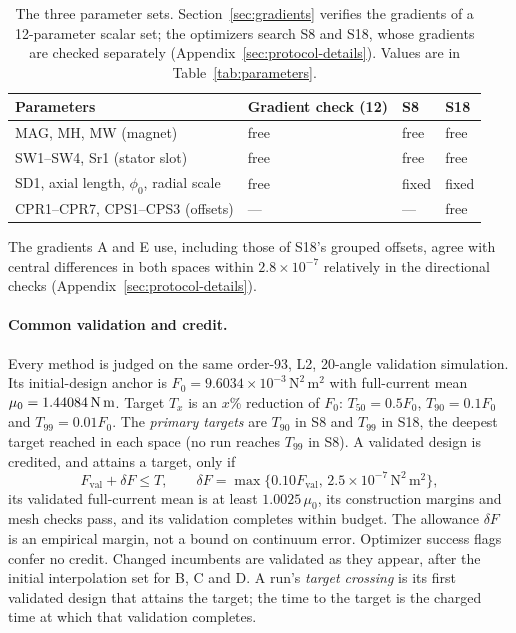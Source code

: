 \begin{table}[H]\centering\small
\caption{The three parameter sets. Section~\ref{sec:gradients} verifies
the gradients of a 12-parameter scalar set; the optimizers search S8 and
S18, whose gradients are checked separately
(Appendix~\ref{sec:protocol-details}). Values are in
Table~\ref{tab:parameters}.}
\label{tab:paramsets}
\begin{tabular}{llll}\toprule
Parameters & Gradient check (12) & S8 & S18\\\midrule
MAG, MH, MW (magnet) & free & free & free\\
SW1--SW4, Sr1 (stator slot) & free & free & free\\
SD1, axial length, $\phi_0$, radial scale & free & fixed & fixed\\
CPR1--CPR7, CPS1--CPS3 (offsets) & --- & --- & free\\\bottomrule
\end{tabular}
\end{table}

The gradients A and E use, including those of S18's grouped offsets,
agree with central differences in both spaces within $2.8\times10^{-7}$
relatively in the directional checks (Appendix~\ref{sec:protocol-details}).

\paragraph{Common validation and credit.}
Every method is judged on the same order-93, L2, 20-angle validation simulation.
Its initial-design anchor is $F_0=9.6034\times10^{-3}\,\mathrm{N^2\,m^2}$ with
full-current mean $\mu_0=1.44084\,\mathrm{N\,m}$. Target $T_x$ is an $x$\% reduction
of $F_0$: $T_{50}=0.5F_0$, $T_{90}=0.1F_0$ and $T_{99}=0.01F_0$. The
\emph{primary targets} are $T_{90}$ in S8 and $T_{99}$ in S18, the deepest
target reached in each space (no run reaches $T_{99}$ in S8). A validated
design is credited, and attains a target, only if
\begin{equation}
 F_{\mathrm{val}}+\delta F\leq T,\qquad
 \delta F=\max\{0.10F_{\mathrm{val}},\,2.5\times10^{-7}\,\mathrm{N^2\,m^2}\},
\end{equation}
its validated full-current mean is at least $1.0025\,\mu_0$, its
construction margins and mesh checks pass, and its validation completes
within budget. The allowance $\delta F$ is an empirical margin, not a bound
on continuum error. Optimizer success flags confer no credit. Changed
incumbents are validated as they appear, after the initial interpolation
set for B, C and D. A run's \emph{target crossing} is its first validated
design that attains the target; the time to the target is the charged time
at which that validation completes.

